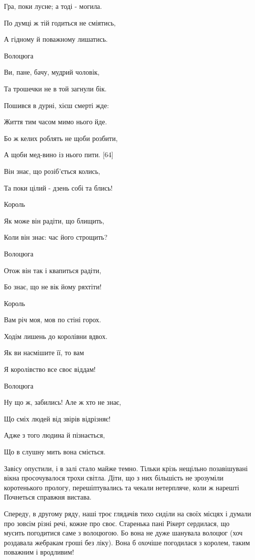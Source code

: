 Гра, поки лусне; а тоді - могила.

По думці ж тій годиться не сміятись,

А гідному й поважному лишатись.

Волоцюга

Ви, пане, бачу, мудрий чоловік,

Та трошечки не в той загнули бік.

Пошився в дурні, хієш смерті жде:

Життя тим часом мимо нього йде.

Бо ж келих роблять не щоби розбити,

А щоби мед-вино із нього пити. [64]

Він знає, що розіб'ється колись,

Та поки цілий - дзень собі та блись!

Король

Як може він радіти, що блищить,

Коли він знає: час його строщить?

Волоцюга

Отож він так і квапиться радіти,

Бо знає, що не вік йому ряхтіти!

Король

Вам річ моя, мов по стіні горох.

Ходім лишень до королівни вдвох.

Як ви насмішите її, то вам

Я королівство все своє віддам!

Волоцюга

Ну що ж, забились! Але ж хто не знає,

Що сміх людей від звірів відрізняє!

Адже з того людина й пізнається,

Що в слушну мить вона сміється.

Завісу опустили, і в залі стало майже темно. Тільки крізь нещільно позавішувані вікна просочувалося трохи світла. Діти, що з них більшість не зрозуміли коротенького прологу, перешіптувались та чекали нетерпляче, коли ж нарешті Почнеться справжня вистава.

Спереду, в другому ряду, наші троє глядачів тихо сиділи на своїх місцях і думали про зовсім різні речі, кожне про своє. Старенька пані Рікерт сердилася, що мусить погодитися саме з волоцюгою. Бо вона не дуже шанувала волоцюг (хоч роздавала жебракам гроші без ліку). Вона б охочіше погодилася з королем, таким поважним і вродливим!

